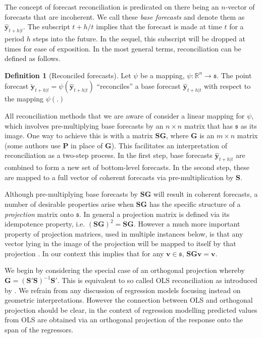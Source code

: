 \documentclass[12pt]{article}
\theoremstyle{definition}
\newtheorem{definition}{Definition}[section]
\theoremstyle{property}
\begin{document}
	The concept of forecast reconciliation is predicated on there being an $n$-vector of forecasts that are incoherent.  We call these {\em base forecasts} and denote them as $\hat{\bm{y}}_{t+h|t}$. The subscript $t+h/t$ implies that the forecast is made at time $t$ for a period $h$ steps into the future.  In the sequel, this subscript will be dropped at times for ease of exposition.  In the most general terms, reconciliation can be defined as follows.
	
	\begin{definition}[Reconciled forecasts]\label{def:reconpoint}
		Let $\psi$ be a mapping, $\psi:\mathbb{R}^n\rightarrow\mathfrak{s}$.  The point forecast $\tilde{\bm{y}}_{t+h|t}=\psi\left(\hat{\bm{y}}_{t+h|t}\right)$ ``reconciles'' a base forecast $\hat{\bm{y}}_{t+h|t}$ with respect to the mapping $\psi(.)$
	\end{definition}
	
	All reconciliation methods that we are aware of consider a linear mapping for $\psi$, which involves pre-multiplying base forecasts by an $n\times n$ matrix that has $\mathfrak{s}$ as its image.  One way to achieve this is with a matrix $\bm{SG}$, where $\bm{G}$ is an $m\times n$ matrix  (some authors use $\bm{P}$ in place of $\bm{G}$).  This facilitates an interpretation of reconciliation as a two-step process. In the first step, base forecasts $\hat{\bm{y}}_{t+h|t}$ are combined to form a new set of bottom-level forecasts. In the second step, these are mapped to a full vector of coherent forecasts via pre-multiplication by $\bm{S}$.
	
	Although pre-multiplying base forecasts by $\bm{SG}$ will result in coherent forecasts, a number of desirable properties arise when $\bm{SG}$ has the specific structure of a {\em projection} matrix onto $\mathfrak{s}$.  In general a projection matrix is defined via its idempotence property, i.e. $(\bm{SG})^2=\bm{SG}$.  However a much more important property of projection matrices, used in multiple instances below, is that any vector lying in the image of the projection will be mapped to itself by that projection \citep[see Lemma 2.4 in][for a proof]{rao1974}. In our context this implies that for any $\bm{v}\in\mathfrak{s}$, $\bm{SGv}=\bm{v}$.
	
	We begin by considering the special case of an orthogonal projection whereby $\bm{G}=\left(\bm{S}'\bm{S}\right)^{-1}\bm{S}'$.  This is equivalent to so called OLS reconciliation as introduced by \cite{Hyndman2011}.  We refrain from any discussion of regression models focusing instead on geometric interpretations.  However the connection between OLS and orthogonal projection should be clear, in the context of regression modelling predicted values from OLS are obtained via an orthogonal projection of the response onto the span of the regressors.
	
\end{document}
